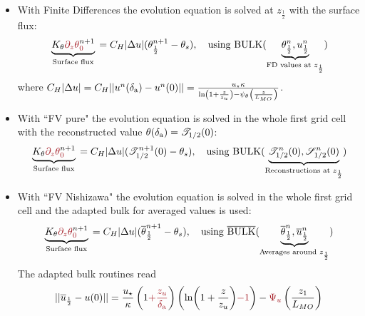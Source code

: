 \begin{itemize}
	\item With Finite Differences the evolution equation is
		solved at $z_{\frac{1}{2}}$ with the surface flux:
		\begin{equation}
			\underbrace{K_\theta
			\emphase{\partial_z \theta}^{n+1}_\emphase{0}}_{\text{
				Surface flux
			}} =
			C_H|\Delta u|(
			\theta_{\frac{1}{2}}^{n+1} - \theta_s),
			~~~ \text{using } {\rm BULK}
			(\underbrace{\theta_{\frac{1}{2}}^{n},
			u_{\frac{1}{2}}^{n}}_{
				\text{FD values at } z_{\frac{1}{2}}
			})
		\end{equation}
		where 
$C_H|\Delta u| = C_H||u^n(\delta_{\rm a})- u^n(0)|| = 
\frac{u_\star \kappa}{\ln\left(1+\frac{z}{z_{u}}\right)
    - \psi_\theta\left(\frac{z}{L_{MO}}\right) }$.

	\item With ``FV pure" the evolution equation is solved in 
		the whole first grid cell with the reconstructed
		value $\theta(\delta_{\rm a}) = {\cal T}_{1/2}(0)$:
		\begin{equation}
			\underbrace{K_\theta
			\emphase{\partial_z \theta}^{n+1}_\emphase{0}}_{\text{
				Surface flux
			}} =
			C_H|\Delta u|({\cal T}_{1/2}^{n+1}(0)
			- \theta_s),
			~~~ \text{using } {\rm BULK}
			(\underbrace{{\cal T}_{1/2}^{n}(0),
			{\cal S}_{1/2}^{n}(0)}_{
			\text{Reconstructions at } z_{\frac{1}{2}}
			})
		\end{equation}
	\item With ``FV Nishizawa" the evolution equation is solved in
		the whole first grid cell and the adapted bulk
		for averaged values is used:
		\begin{equation}
			\underbrace{K_\theta
			\emphase{\partial_z \theta}^{n+1}_\emphase{0}}_{\text{
				Surface flux
			}} =
			C_H|\Delta u| (
			\overline{\theta}_{\frac{1}{2}}^{n+1}
			- \theta_s),
			~~~ \text{using } \overline{\rm BULK}
			(\underbrace{\overline{\theta}_{\frac{1}{2}}^{n},
			\overline{u}_{\frac{1}{2}}^{n}}_{
			\text{Averages around } z_\frac{1}{2}})
		\end{equation}
		The adapted bulk routines read
		\begin{equation}
		\label{eq:ND_StratifiedCase_MOST}
		\begin{aligned}
			 ||\overline{u}_{\frac{1}{2}}-u(0)||
			 = \frac{u_\star}{\kappa}
			\left(1\emphase{+\frac{z_u}{\delta_{\rm a}}}\right)
		\left(\ln(1+\frac{z}{z_u})\emphase{-1}\right)
		- \emphase{\Psi_u}\left(\frac{z_1}{L_{MO}}\right)
		    \\

\end{aligned}
\end{equation}
\end{itemize}
